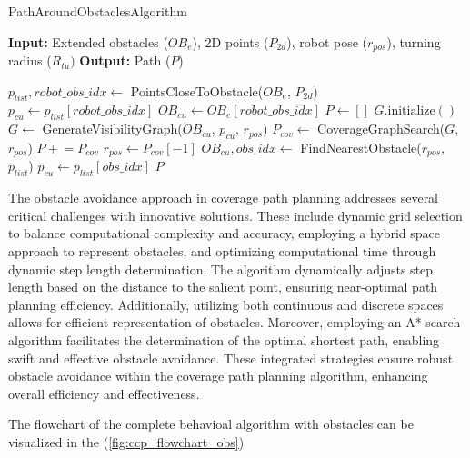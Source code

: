 \begin{algorithm}[H]     
    \caption{PathAroundObstaclesAlgorithm}  
    \label{alg:path_around_obstacles_algorithm}
    \begin{algorithmic}[1]
    \Statex \textbf{Input:} Extended obstacles ($OB_e$), 2D points ($P_{2d}$), robot pose ($r_{pos}$), turning radius ($R_{tu}) $
    \Statex \textbf{Output:} Path ($P$)
    \newline
    
    \State $p_{list}, robot\_obs\_idx \leftarrow$ PointsCloseToObstacle($OB_e$, $P_{2d}$)
    \State $p_{cu} \leftarrow p_{list}[robot\_obs\_idx]$    
    \State $OB_{cu} \leftarrow OB_e[robot\_obs\_idx]$
    \State $P \leftarrow []$
        \State $G.\text{initialize}()$
        \State $G \leftarrow$ GenerateVisibilityGraph($OB_{cu}$, $p_{cu}$, $r_{pos}$)
        \State $P_{cov} \leftarrow$ CoverageGraphSearch($G$, $r_{pos}$)
        \State $P \mathrel{+}= P_{cov}$
        \State $r_{pos} \leftarrow P_{cov}[-1]$
        \State $OB_{cu}, obs\_idx \leftarrow$ FindNearestObstacle($r_{pos}$, $p_{list}$)
        \State $p_{cu} \leftarrow p_{list}[obs\_idx]$
    \EndFor
    \State \Return $P$
    \end{algorithmic}
    \end{algorithm}




The obstacle avoidance approach in coverage path planning addresses several critical challenges with innovative solutions. These include dynamic grid selection to balance computational complexity and accuracy, employing a hybrid space approach to represent obstacles, and optimizing computational time through dynamic step length determination. The algorithm dynamically adjusts step length based on the distance to the salient point, ensuring near-optimal path planning efficiency. Additionally, utilizing both continuous and discrete spaces allows for efficient representation of obstacles. Moreover, employing an A* search algorithm facilitates the determination of the optimal shortest path, enabling swift and effective obstacle avoidance. These integrated strategies ensure robust obstacle avoidance within the coverage path planning algorithm, enhancing overall efficiency and effectiveness.


\vspace*{6mm}  


The flowchart of the complete behavioal algorithm with obstacles can be visualized in the (\autoref{fig:ccp_flowchart_obs})



